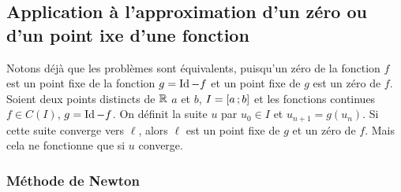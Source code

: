 \subsection{Application à l'approximation d'un zéro ou d'un point ixe d'une fonction}

Notons déjà que les problèmes sont équivalents, puisqu'un zéro de la fonction \(f\) est un point fixe de la fonction \(g=\operatorname{Id}-f\) et un point fixe de \(g\) est un zéro de \(f\). Soient deux points distincts de \(\mathbb{R}\) \(a\) et \(b\), \(I=\left[ a \, ;  b \right]\) et les fonctions continues \(f \in \mathit{C}(I)\), \(g=\operatorname{Id} - f\). On définit la suite \(u\) par \(u_0 \in I\) et \(u_{n+1}=g(u_n)\). Si cette suite converge vers \(\ell\), alors \(\ell\) est un point fixe de \(g\) et un zéro de \(f\). Mais cela ne fonctionne que si \(u\) converge.

\subsubsection{Méthode de Newton}

